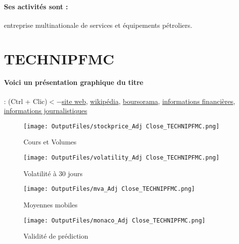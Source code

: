 \documentclass[11pt,a4paper]{report}%
\begin{document}
\paragraph{Ses activités sont : } entreprise multinationale de services et équipements pétroliers.  
    
    \newpage

\section{TECHNIPFMC}

\paragraph{Voici un présentation graphique du titre} : (Ctrl + Clic)$<-$\href{https://investors.technipfmc.com/financial-information/results-center}{site web}, \href{https://fr.wikipedia.org/wiki/TechnipFMC}{wikipédia}, \href{https://www.boursorama.com/cours/1rPFTI}{boursorama}, \href{https://www.qwant.com/?q=site:https:%2f%2fwww.easybourse.com%2faction-societe%2fTECHNIPFMC&t=web&client=ext-firefox-hp}{informations financières}, \href{https://bourse.lerevenu.com/cours-de-bourse/fiche-valeur-synthese/TECHNIPFMC/FTI-FR}{informations journalistiques}
\begin{figure}[!htb]
   \begin{minipage}{0.5\textwidth}
     \centering
     \texttt{[image: OutputFiles/stockprice\_Adj Close\_TECHNIPFMC.png]}
     \caption{Cours et Volumes}\label{Fig:price_TECHNIPFMC}
   \end{minipage}\hfill
   \begin{minipage}{0.5\textwidth}
     \centering
     \texttt{[image: OutputFiles/volatility\_Adj Close\_TECHNIPFMC.png]}
     \caption{Volatilité à 30 jours}\label{Fig:volat_TECHNIPFMC}
   \end{minipage}
\end{figure}
\begin{figure}[!htb]
   \begin{minipage}{0.5\textwidth}
     \centering
     \texttt{[image: OutputFiles/mva\_Adj Close\_TECHNIPFMC.png]}
     \caption{Moyennes mobiles}\label{Fig:mva_TECHNIPFMC}
   \end{minipage}\hfill
   \begin{minipage}{0.5\textwidth}
     \centering
     \texttt{[image: OutputFiles/monaco\_Adj Close\_TECHNIPFMC.png]}
     \caption{Validité de prédiction}\label{Fig:prediction_TECHNIPFMC}
   \end{minipage}
\end{figure}
\end{document}

